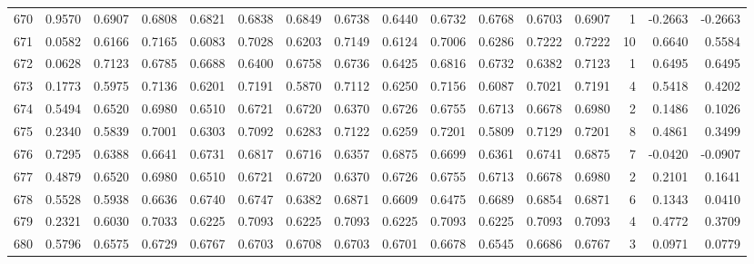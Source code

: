\begin{tabular}{lrrrrrrrrrrrrrrr}
670 &      0.9570 &  0.6907 &  0.6808 &  0.6821 &  0.6838 &  0.6849 &  0.6738 &  0.6440 &  0.6732 &  0.6768 &   0.6703 &     0.6907 &      1 &                   -0.2663 &                    -0.2663 \\
671 &      0.0582 &  0.6166 &  0.7165 &  0.6083 &  0.7028 &  0.6203 &  0.7149 &  0.6124 &  0.7006 &  0.6286 &   0.7222 &     0.7222 &     10 &                    0.6640 &                     0.5584 \\
672 &      0.0628 &  0.7123 &  0.6785 &  0.6688 &  0.6400 &  0.6758 &  0.6736 &  0.6425 &  0.6816 &  0.6732 &   0.6382 &     0.7123 &      1 &                    0.6495 &                     0.6495 \\
673 &      0.1773 &  0.5975 &  0.7136 &  0.6201 &  0.7191 &  0.5870 &  0.7112 &  0.6250 &  0.7156 &  0.6087 &   0.7021 &     0.7191 &      4 &                    0.5418 &                     0.4202 \\
674 &      0.5494 &  0.6520 &  0.6980 &  0.6510 &  0.6721 &  0.6720 &  0.6370 &  0.6726 &  0.6755 &  0.6713 &   0.6678 &     0.6980 &      2 &                    0.1486 &                     0.1026 \\
675 &      0.2340 &  0.5839 &  0.7001 &  0.6303 &  0.7092 &  0.6283 &  0.7122 &  0.6259 &  0.7201 &  0.5809 &   0.7129 &     0.7201 &      8 &                    0.4861 &                     0.3499 \\
676 &      0.7295 &  0.6388 &  0.6641 &  0.6731 &  0.6817 &  0.6716 &  0.6357 &  0.6875 &  0.6699 &  0.6361 &   0.6741 &     0.6875 &      7 &                   -0.0420 &                    -0.0907 \\
677 &      0.4879 &  0.6520 &  0.6980 &  0.6510 &  0.6721 &  0.6720 &  0.6370 &  0.6726 &  0.6755 &  0.6713 &   0.6678 &     0.6980 &      2 &                    0.2101 &                     0.1641 \\
678 &      0.5528 &  0.5938 &  0.6636 &  0.6740 &  0.6747 &  0.6382 &  0.6871 &  0.6609 &  0.6475 &  0.6689 &   0.6854 &     0.6871 &      6 &                    0.1343 &                     0.0410 \\
679 &      0.2321 &  0.6030 &  0.7033 &  0.6225 &  0.7093 &  0.6225 &  0.7093 &  0.6225 &  0.7093 &  0.6225 &   0.7093 &     0.7093 &      4 &                    0.4772 &                     0.3709 \\
680 &      0.5796 &  0.6575 &  0.6729 &  0.6767 &  0.6703 &  0.6708 &  0.6703 &  0.6701 &  0.6678 &  0.6545 &   0.6686 &     0.6767 &      3 &                    0.0971 &                     0.0779 \\

\end{tabular}
